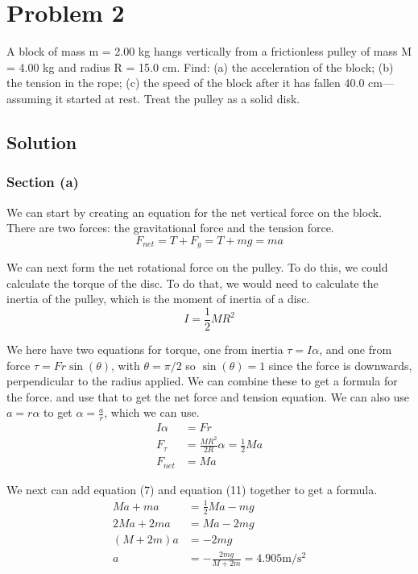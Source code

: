\documentclass[12pt]{article}
\begin{document}
\pagebreak
\section{Problem 2}
A block of mass m = 2.00 kg hangs vertically from a frictionless pulley of mass M = 4.00 kg and radius R = 15.0 cm. Find: (a) the acceleration of the block; (b) the tension in the rope; (c) the speed of the block after it has fallen 40.0 cm—assuming it started at rest. Treat the pulley as a solid disk.

\subsection{Solution}
\subsubsection{Section (a)}
We can start by creating an equation for the net vertical force on the block. There are two forces: the gravitational force and the tension force.
\begin{equation} F_{net} = T + F_g = T + mg = ma \end{equation}

We can next form the net rotational force on the pulley. To do this, we could calculate the torque of the disc. To do that, we would need to calculate the inertia of the pulley, which is the moment of inertia of a disc.
\begin{equation} I = \frac{1}{2}MR^2 \end{equation}

We here have two equations for torque, one from inertia \(\tau = I\alpha\), and one from force \(\tau = Fr\sin(\theta)\), with $\theta = \pi/2$ so $\sin(\theta) = 1$ since the force is downwards, perpendicular to the radius applied. We can combine these to get a formula for the force. and use that to get the net force and tension equation. We can also use $a = r\alpha$ to get $\alpha = \frac{a}{r}$, which we can use. 
\begin{align}
    I\alpha &=  Fr\\
    F_\tau  &=  \frac{MR^2}{2R}\alpha
        =   \frac{1}{2}Ma\\
    F_{net} &=  Ma
\end{align}

We next can add equation (7) and equation (11) together to get a formula.
\begin{align}
    Ma + ma &=  \frac{1}{2}Ma - mg\\
    2Ma + 2ma   &=  Ma - 2mg\\
    (M + 2m)a   &=  -2mg\\
    a   &=  -\frac{2mg}{M + 2m} 
        =   \boxed{4.905\unit{\meter/\second^2}}
\end{align}
\end{document}
